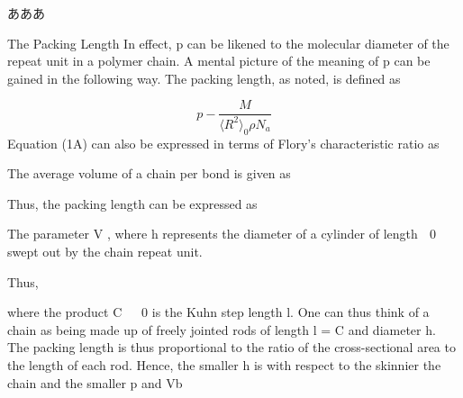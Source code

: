 \documentclass[a4paper,11pt]{ltjsarticle}
\begin{document}
あああ

The Packing Length 
In effect, p can be likened to the molecular diameter of the repeat unit in a polymer chain. A mental picture of the meaning of p can be gained in the following way. The packing length, as noted, is defined as 

\begin{equation}
    p-\dfrac{M}{\langle R^2 \rangle_0 \rho N_a}
\end{equation}
Equation (1A) can also be expressed in terms of Flory’s characteristic ratio as 

The average volume of a chain per bond is given as 

Thus, the packing length can be expressed as 

The parameter V 
, where h represents the diameter of a cylinder of length  
0 
swept out 
by the chain repeat unit. 

Thus, 

where the product C 
 
 
0 
is the Kuhn step length 
l. One can thus think of a chain as being made up of freely jointed rods of length l = C and diameter h. The packing length is thus proportional to the ratio of the cross-sectional area to the length of each rod. Hence, the smaller h is with respect to the skinnier the chain and the smaller p and Vb 
\end{document}
